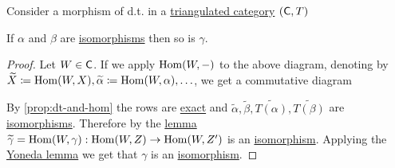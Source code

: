\documentclass[../../main]{subfiles}
\begin{document}
\begin{proposition}\label{prop:triangulated-two-isos}
  Consider a morphism of d.t. in a \hyperref[def:triangulated-category]{triangulated category} \((\mathsf{C}, T)\)
  \begin{center}
  \end{center}
  If \(\alpha\) and \(\beta\) are \hyperref[def:categorical-isomorphism]{isomorphisms} then so is \(\gamma\).
\end{proposition}
\begin{proof}
  Let \(W \in \mathsf{C}\).
  If we apply \(\operatorname{Hom}(W, -)\) to the above diagram, denoting by \(\widetilde{X} \coloneq \operatorname{Hom}(W, X), \widetilde{\alpha} \coloneq \operatorname{Hom}(W, \alpha), \ldots\), we get a commutative diagram
  \begin{center}
  \end{center}
  By \autoref{prop:dt-and-hom} the rows are \hyperref[def:exact-sequence]{exact} and \(\widetilde{\alpha}, \widetilde{\beta}, \widetilde{T(\alpha)}, \widetilde{T(\beta)}\) are \hyperref[def:categorical-isomorphism]{isomorphisms}.
  Therefore by the \hyperref[lemma:five-lemma]{lemma} \(\widetilde{\gamma} = \operatorname{Hom}(W, \gamma): \operatorname{Hom}(W, Z) \to \operatorname{Hom}(W, Z')\) is an \hyperref[def:categorical-isomorphism]{isomorphism}.
  Applying the \hyperref[thm:yoneda-lemma]{Yoneda lemma} we get that \(\gamma\) is an \hyperref[def:categorical-isomorphism]{isomorphism}.
\end{proof}
\end{document}
